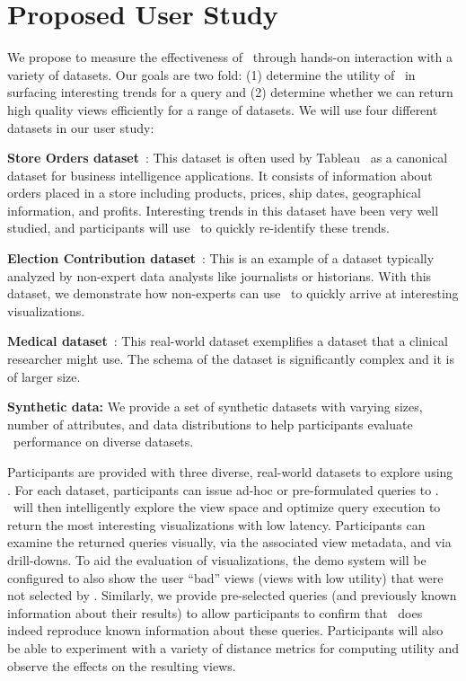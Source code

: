 \section{Proposed User Study}

We propose to measure the effectiveness of \SeeDB\ through hands-on
interaction with a variety of datasets. Our goals are two fold: (1) determine
the utility of \SeeDB\ in surfacing interesting trends for a query
and (2) determine whether we can return high quality views efficiently for
a range of datasets. We will use four different datasets in our user study:

\vspace{5 mm}

\squishlist
  \item {\bf Store Orders dataset}~\cite{superstore}: This dataset is
    often used by Tableau~\cite{tableau} as a canonical dataset for
    business intelligence applications. It consists of information
    about orders placed in a store including products, prices, ship
    dates, geographical information, and profits. Interesting trends in
    this dataset have been very well studied, and participants will use
    \SeeDB\ to quickly re-identify these trends. 
  \item {\bf Election Contribution dataset}~\cite{election_data}: This
  is an example of a dataset typically analyzed by
    non-expert data analysts like journalists or historians. With this
    dataset, we demonstrate how non-experts can use \SeeDB\ to quickly
    arrive at interesting visualizations.
  \item {\bf Medical dataset}~\cite{mimic}: This real-world dataset exemplifies
  a dataset that a clinical researcher might use. The schema of the dataset is
  significantly complex and it is of larger size.  
    \item {\bf Synthetic data:} We provide a set of synthetic datasets with
    varying sizes, number of attributes, and data distributions to help
    participants evaluate \SeeDB\ performance on diverse datasets.
 \squishend

\vspace{5 mm}

 Participants are provided with three
diverse, real-world datasets to explore using \SeeDB. For each dataset,
participants can issue ad-hoc or pre-formulated queries to \SeeDB. \SeeDB\ will
then intelligently explore the view space and optimize query execution to return the
most interesting visualizations with low latency. Participants can examine the
returned queries visually, via the associated view metadata, and via
drill-downs. To aid the evaluation of visualizations, the demo system will 
be configured to also show the user ``bad'' views (views with low utility) that were not selected
by \SeeDB.
Similarly, we provide pre-selected queries (and
previously known information about their results) to allow participants to
confirm that \SeeDB\ does indeed reproduce known information about these
queries. Participants will also be able to experiment with a
variety of distance metrics for computing utility and observe the effects on the
resulting views. \\

